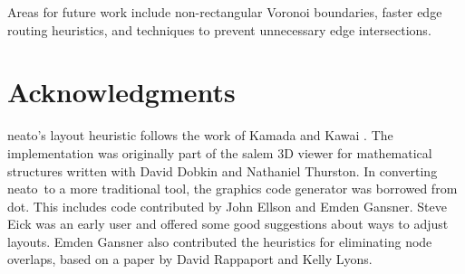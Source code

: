 \documentclass[11pt]{article}
\def\dot{{\sc dot}}
\def\neato{{\sc neato}}
\begin{document}
Areas for future work include non-rectangular Voronoi boundaries,
faster edge routing heuristics, and techniques to prevent
unnecessary edge intersections.

\section{Acknowledgments}

\neato's layout heuristic follows the work of Kamada and Kawai \cite{kk}.
The implementation was originally part of the {\sc salem} 3D viewer
for mathematical structures written with David Dobkin and Nathaniel Thurston.
In converting \neato\ to a more traditional tool, the graphics code generator
was borrowed from \dot.  This includes code contributed by John Ellson and
Emden Gansner.  Steve Eick was an early user and offered some good
suggestions about ways to adjust layouts.  Emden Gansner also contributed
the heuristics for eliminating node overlaps, based on a paper by
David Rappaport and Kelly Lyons.

\small
 
\end{document}
